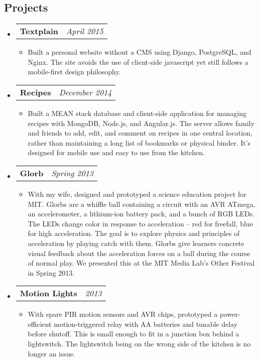 \documentclass[10pt,letterpaper]{article}
\makeatletter
\newcommand{\headerrow}[2]
{\begin{tabular*}{\linewidth}{l@{\extracolsep{\fill}}r}
	#1 & #2 \\
\end{tabular*}}
\makeatother
\begin{document}
\subsection*{Projects}
    \begin{itemize}
        \item \headerrow{\textbf{Textplain}}{\emph{April 2015}}
        \begin{itemize}
            \item Built a personal website without a CMS using Django,
                PostgreSQL, and Nginx.  The site avoids the use of client-side
                javascript yet still follows a mobile-first design philosophy.
        \end{itemize}

        \item \headerrow{\textbf{Recipes}}{\emph{December 2014}}
        \begin{itemize}
            \item Built a MEAN stack database and client-side application for
                managing recipes with MongoDB, Node.js, and Angular.js.  The
                server allows family and friends to add, edit, and comment on
                recipes in one central location, rather than maintaining a long
                list of bookmarks or physical binder.  It's designed for mobile
                use and easy to use from the kitchen.
        \end{itemize}

        \item \headerrow{\textbf{Glorb}}{\emph{Spring 2013}}
        \begin{itemize}
            \item With my wife, designed and prototyped a science education
                project for MIT\@.  Glorbs are a whiffle ball containing a
                circuit with an AVR ATmega, an accelerometer, a lithium-ion
                battery pack, and a bunch of RGB LEDs.  The LEDs change color
                in response to acceleration -- red for freefall, blue for high
                acceleration.  The goal is to explore physics and principles of
                acceleration by playing catch with them.  Glorbs give learners
                concrete visual feedback about the acceleration forces on a
                ball during the course of normal play.  We presented this at
                the MIT Media Lab's Other Festival in Spring 2013.
        \end{itemize}

        \item \headerrow{\textbf{Motion Lights}}{\emph{2013}}
        \begin{itemize}
            \item With spare PIR motion sensors and AVR chips, prototyped a
                power-efficient motion-triggered relay with AA batteries and
                tunable delay before shutoff.  This is small enough to fit in a
                junction box behind a lightswitch.  The lightswitch being on
                the wrong side of the kitchen is no longer an issue.
        \end{itemize}
    \end{itemize}
\end{document}
